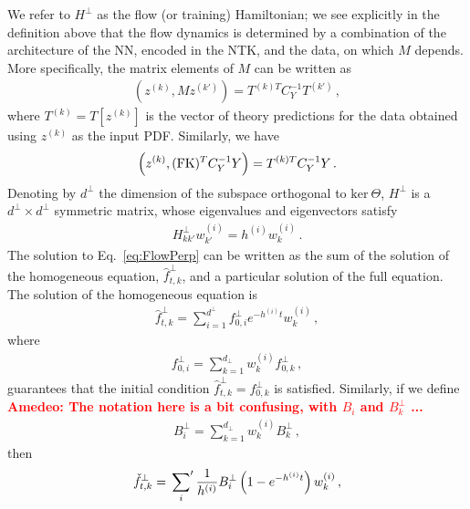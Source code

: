 \documentclass[11pt]{article}
\newcommand{\ac}[1]{\textcolor{red}{\textbf{Amedeo: #1}}}
\begin{document}
We refer to $H^\perp$ as the flow (or training) Hamiltonian; we see explicitly in the definition above that
the flow dynamics is determined by a combination of the architecture of the NN, encoded in the NTK, and the
data, on which $M$ depends. More specifically, the matrix elements of $M$ can be written as
\begin{align}
    \label{eq:MMatElems}
    \left(z^{(k)}, M z^{(k')}\right) = T^{(k)T} C_Y^{-1} T^{(k')}\, ,
\end{align}
where $T^{(k)} = T[z^{(k)}]$ is the vector of theory predictions for the data obtained using $z^{(k)}$ as the
input PDF. Similarly, we have
\begin{align}
    \label{eq:BMatElems}
    \left(z^{(k)}, (\mathrm{FK})^T C_Y^{-1} Y\right) = T^{(k)T} C_Y^{-1} Y\, .
\end{align}
Denoting by $d^\perp$ the dimension of the subspace orthogonal to $\text{ker}\ \Theta$, $H^\perp$ is
a $d^\perp\times d^\perp$ symmetric matrix, whose eigenvalues and eigenvectors satisfy
\begin{align}
    H^\perp_{kk'} w^{(i)}_{k'} = h^{(i)} w^{(i)}_{k}\, .
\end{align}
The solution to Eq.~\eqref{eq:FlowPerp} can be written as the sum of the solution of the
homogeneous equation, $\hat{f}^{\perp}_{t,k}$, and a particular solution of the full equation.
The solution of the homogeneous equation is
\begin{align}
    \label{eq:HomoSoln}
    \hat{f}^{\perp}_{t,k} = \sum_{i=1}^{d^\perp} f^{\perp}_{0,i} e^{-h^{(i)}t} w^{(i)}_k\, ,
\end{align}
where
\begin{align}
    \label{eq:InitialCi}
    f^{\perp}_{0,i} = \sum_{k=1}^{d_\perp} w^{(i)}_k f^\perp_{0,k}\, ,
\end{align}
guarantees that the initial condition $\hat{f}^\perp_{t,k}=f^\perp_{0,k}$ is
satisfied. Similarly, if we define
\ac{The notation here is a bit confusing, with $B_i$ and $B^\perp_k$ ...}
\begin{align}
    \label{eq:BiDef}
    B^{\perp}_i = \sum_{k=1}^{d_\perp} w^{(i)}_k B^\perp_{k}\, ,
\end{align}
then
\begin{align}
    \label{eq:PartSol}
    \check{f}^\perp_{t,k} = \sideset{}{'}\sum_{i} \frac{1}{h^{(i)}} B^{\perp}_i
        \left(1 - e^{-h^{(i)}t}\right) w^{(i)}_k\, ,
\end{align}
\end{document}
